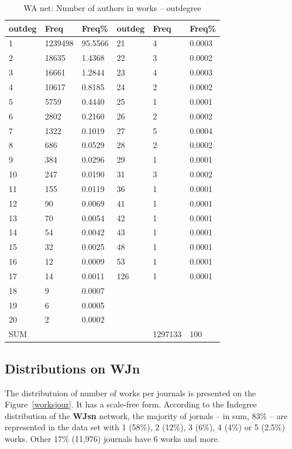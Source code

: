 \documentclass[11pt]{article} %
\begin{document}
\begin{table}
\caption{WA net: \label{numpapout} Number of authors in works -- outdegree}
\renewcommand{\arraystretch}{0.9}
\begin{center}
\begin{tabular}{l|l|l||l|l|l}
outdeg&  	Freq&  	Freq\% &  	outdeg&   Freq &	Freq\%\\ \hline   
1&  	1239498&  	95.5566&  	21&  	4&  	0.0003\\
2&  	18635&  	1.4368&  	22&  	3&  	0.0002\\
3&  	16661&  	1.2844&  	23&  	4&  	0.0003\\
4&  	10617&  	0.8185&  	24&  	2&  	0.0002\\
5&  	5759&  	0.4440&  	25&  	1&  	0.0001\\
6&  	2802&  	0.2160&  	26&  	2&  	0.0002\\
7&  	1322&  	0.1019&  	27&  	5&  	0.0004\\
8&  	686&  	0.0529&  	28&  	2&  	0.0002\\
9&  	384&  	0.0296&  	29&  	1&  	0.0001\\
10&  	247&  	0.0190&  	31&  	3&  	0.0002\\
11&  	155&  	0.0119&  	36&  	1&  	0.0001\\
12&  	90&  	0.0069&  	41&  	1&  	0.0001\\
13&  	70&  	0.0054&  	42&  	1&  	0.0001\\
14&  	54&  	0.0042&  	43&  	1&  	0.0001\\
15&  	32&  	0.0025&  	48&  	1&  	0.0001\\
16&  	12&  	0.0009&  	53&  	1&  	0.0001\\
17&  	14&  	0.0011&  	126&  	1&  	0.0001\\
18&  	9&  	0.0007&  	  & 	 & 	\\
19&  	6&  	0.0005&  	 &	 &	\\
20&  	2&  	0.0002&  	&	 &	\\ \hline
SUM &     &              &       &  1297133 & 100  \\ \hline   
\end{tabular}
\end{center}
\end{table}

\subsection{Distributions on WJn}

The distributuion of number of works per journals is presented on the Figure~\ref{worksjour}. It has a scale-free form. According to the Indegree distribution of the \textbf{WJsn} network, the majority of jornals -- in sum, 83\% -- are represented  in the data set with 1 (58\%), 2 (12\%), 3 (6\%), 4 (4\%) or 5 (2.5\%) works. Other 17\% (11,976) journals have 6 works and more. \medskip
\end{document}
